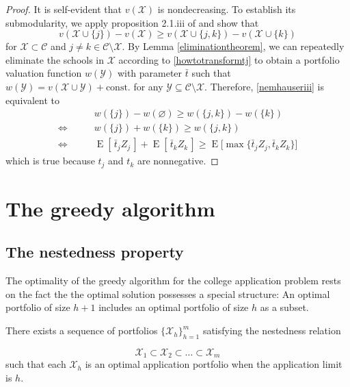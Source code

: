 \begin{proof}
It is self-evident that $v(\mathcal{X})$ is nondecreasing. To establish its submodularity, we apply proposition 2.1.iii of \cite{nemhauserandwolsey1978} and show that
\begin{equation}\label{nemhauseriii}
v(\mathcal{X} \cup \{j\}) - v(\mathcal{X}) \geq 
v(\mathcal{X} \cup \{j, k\}) - v(\mathcal{X} \cup \{k\})
\end{equation}
for $\mathcal{X} \subset \mathcal{C}$ and $j \neq k \in \mathcal{C} \setminus \mathcal{X}$. By Lemma \ref{eliminationtheorem}, we can repeatedly eliminate the schools in $\mathcal{X}$ according to \eqref{howtotransformtj} to obtain a portfolio valuation function $w(\mathcal{Y})$ with parameter $\bar t$ such that $w(\mathcal{Y}) = v(\mathcal{X} \cup \mathcal{Y}) + \text{const.}$ for any $\mathcal{Y} \subseteq \mathcal{C} \setminus \mathcal{X}$. Therefore, \eqref{nemhauseriii} is equivalent to
\begin{align}
& w(\{j\}) - w(\varnothing) \geq w(\{j, k\}) - w(\{k\}) \\
\iff \qquad &w(\{j\})  +  w(\{k\})  \geq w(\{j, k\})  \\
\iff \qquad &\operatorname{E}[\,\bar t_j Z_j\,] + \operatorname{E}[\,\bar t_k Z_k\,] 
\geq \operatorname{E}\bigl[\max\{ \bar t_j Z_j, \bar t_k Z_k \} \bigr]
\end{align}
which is true because $t_j$ and $t_k$ are nonnegative.
\end{proof}











\section{The greedy algorithm} \label{sectionGreedy}

\subsection{The nestedness property} 
The optimality of the greedy algorithm for the college application problem rests on the fact the the optimal solution possesses a special structure: An optimal portfolio of size $h+1$ includes an optimal portfolio of size $h$ as a subset.

\begin{theorem} \label{nestedapplication}
There exists a sequence of portfolios $\{\mathcal{X}_h\}_{h=1}^m$ satisfying the nestedness relation

\begin{equation}
\mathcal{X}_1 \subset \mathcal{X}_2\subset \dots \subset \mathcal{X}_m
\end{equation}
such that each $\mathcal{X}_h$ is an optimal application portfolio when the application limit is $h$.
\end{theorem}

